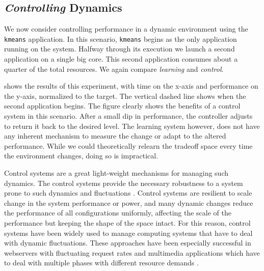 \subsection{\emph{Controlling} Dynamics}
We now consider controlling performance in a dynamic environment using
the \texttt{kmeans} application.  In this scenario, \texttt{kmeans}
begins as the only application running on the system.  Halfway through
its execution we launch a second application on a single big core.
This second application consumes about a quarter of the total
resources.  We again compare \emph{learning} and \emph{control}.


 shows the results of this experiment,
with time on the x-axis and performance on the y-axis, normalized to
the target.  The vertical dashed line shows when the second
application begins.  The figure clearly shows the benefits of a
control system in this scenario.  After a small dip in performance,
the controller adjusts to return it back to the desired level.  The
learning system however, does not have any inherent mechanism to
measure the change or adapt to the altered performance.  While we
could theoretically relearn the tradeoff space every time the
environment changes, doing so is impractical.

Control systems are a great light-weight mechanisms for managing such
dynamics. The control systems provide the necessary robustness to a
system prone to such dynamics and fluctuations
\cite{Hellerstein2004a}. Control systems are resilient to scale change
in the system performance or power, and many dynamic changes reduce
the performance of all configurations uniformly, affecting the scale
of the performance but keeping the shape of the space intact.  For
this reason, control systems have been widely used to manage computing
systems that have to deal with dynamic fluctuations.  These approaches
have been especially successful in webservers with fluctuating request
rates \cite{Horvarth,LuEtAl-2006a,SunDaiPan-2008a} and multimedia
applications which have to deal with multiple phases with different
resource demands \cite{TCST,Agilos,grace2}.


